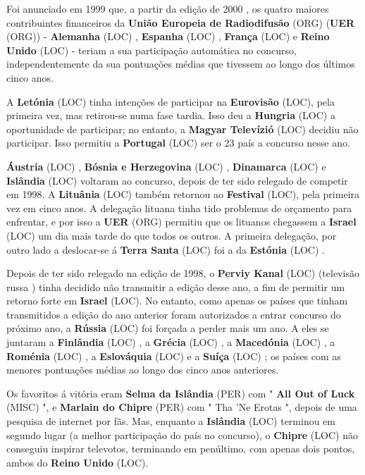 \documentclass[12pt,a4paper]{article}
\begin{document}
Foi anunciado em 1999 que, a partir da edição de 2000 , os quatro maiores contribuintes financeiros da \textbf{União Europeia de Radiodifusão} (ORG) (\textbf{UER} (ORG)) - \textbf{Alemanha} (LOC) , \textbf{Espanha} (LOC) , \textbf{França} (LOC) e \textbf{Reino Unido} (LOC) - teriam a sua participação automática no concurso, independentemente da sua pontuações médias que tivessem ao longo dos últimos cinco anos.

A \textbf{Letónia} (LOC) tinha intenções de participar na \textbf{Eurovisão} (LOC), pela primeira vez, mas retirou-se numa fase tardia. Isso deu a \textbf{Hungria} (LOC) a oportunidade de participar; no entanto, a \textbf{Magyar Televízió} (LOC) decidiu não participar. Isso permitiu a \textbf{Portugal} (LOC) ser o 23 país a concurso nesse ano.

\textbf{Áustria} (LOC) , \textbf{Bósnia e Herzegovina} (LOC) , \textbf{Dinamarca} (LOC) e \textbf{Islândia} (LOC) voltaram ao concurso, depois de ter sido relegado de competir em 1998. A \textbf{Lituânia} (LOC) também retornou ao \textbf{Festival} (LOC), pela primeira vez em cinco anos. A delegação lituana tinha tido problemas de orçamento para enfrentar, e por isso a \textbf{UER} (ORG) permitiu que os lituanos chegassem a \textbf{Israel} (LOC) um dia mais tarde do que todos os outros. A primeira delegação, por outro lado a deslocar-se á \textbf{Terra Santa} (LOC) foi a da \textbf{Estónia} (LOC) .

Depois de ter sido relegado na edição de 1998, o \textbf{Perviy Kanal} (LOC) (televisão russa ) tinha decidido não transmitir a edição desse ano, a fim de permitir um retorno forte em \textbf{Israel} (LOC). No entanto, como apenas os países que tinham transmitidos a edição do ano anterior foram autorizados a entrar concurso do próximo ano, a \textbf{Rússia} (LOC) foi forçada a perder mais um ano. A eles se juntaram a \textbf{Finlândia} (LOC) , a \textbf{Grécia} (LOC) , a \textbf{Macedónia} (LOC) , a \textbf{Roménia} (LOC) , a \textbf{Eslováquia} (LOC) e a \textbf{Suíça} (LOC) ; os países com as menores pontuações médias ao longo dos cinco anos anteriores.

Os favoritos á vitória eram \textbf{Selma da Islândia} (PER) com " \textbf{All Out of Luck} (MISC) ", e \textbf{Marlain do Chipre} (PER) com " Tha 'Ne Erotas ", depois de uma pesquisa de internet por fãs. Mas, enquanto a \textbf{Islândia} (LOC) terminou em segundo lugar (a melhor participação do país no concurso), o \textbf{Chipre} (LOC) não conseguiu inspirar televotos, terminando em penúltimo, com apenas dois pontos, ambos do \textbf{Reino Unido} (LOC).
\end{document}
